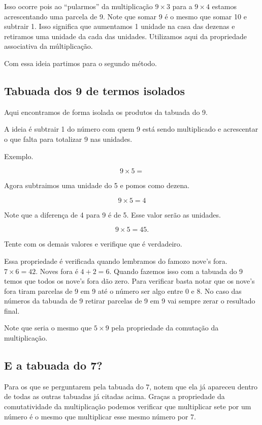 Isso ocorre pois ao ``pularmos'' da multiplicação $9\times3$ para a $9\times4$ estamos acrescentando uma parcela de 9. Note que somar 9 é o mesmo que somar 10 e subtrair 1. Isso significa que aumentamos 1 unidade na casa das dezenas e retiramos uma unidade da cada das unidades. Utilizamos aqui da propriedade associativa da múltiplicação.

Com essa ideia partimos para o segundo método.

\subsection{Tabuada dos 9 de termos isolados}

Aqui encontramos de forma isolada os produtos da tabuada do 9. 

A ideia é subtrair 1 do número com quem 9 está sendo multiplicado e acrescentar o que falta para totalizar 9 nas unidades.

Exemplo.

$$9\times5=$$

Agora subtraimos uma unidade do 5 e pomos como dezena.

$$9\times5=4$$

Note que a diferença de 4 para 9 é de 5. Esse valor serão as unidades.

$$9\times5=45.$$

Tente com os demais valores e verifique que é verdadeiro.

Essa propriedade é verificada quando lembramos do famozo nove's fora. $7\times6=42$. Noves fora é $4+2=6$. Quando fazemos isso com a tabuada do 9 temos que todos os nove's fora dão zero. Para verificar basta notar que os nove's fora tiram parcelas de 9 em 9 até o número ser algo entre 0 e 8. No caso das números da tabuada de 9 retirar parcelas de 9 em 9 vai sempre zerar o resultado final.

Note que seria o mesmo que $5\times9$ pela propriedade da comutação da multiplicação.

\subsection{E a tabuada do 7?}

Para os que se perguntarem pela tabuada do $7$, notem que ela já apareceu dentro de todas as outras tabuadas já citadas acima. Graças a propriedade da comutatividade da multiplicação podemos verificar que multiplicar sete por um número é o mesmo que multiplicar esse mesmo número por 7.

